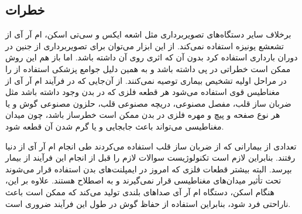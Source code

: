 \subsection{خطرات \mri}
برخلاف سایر دستگاه‌های تصویربرداری مثل اشعه ایکس و سی‌تی اسکن، ام آر آی از تشعشع یونیزه استفاده نمی‌کند. از این ابزار می‌توان برای تصویربرداری از جنین در دوران بارداری استفاده کرد بدون آن که اثری روی آن داشته باشد. اما باز هم این روش ممکن است خطراتی در پی داشته باشد و به همین دلیل جوامع پزشکی استفاده از \mri را در مراحل اولیه تشخیص بیماری توصیه نمی‌کنند. از آن‌جایی که در فرآیند ام آر آی از مغناطیس قوی استفاده می‌شود هر قطعه فلزی که در بدن وجود داشته باشد مثل ضربان ساز قلب، مفصل مصنوعی، دریچه مصنوعی قلب، حلزون مصنوعی گوش و یا هر نوع صفحه و پیچ و مهره فلزی در بدن ممکن است خطرساز باشد، چون میدان مغناطیسی می‌تواند باعث جابجایی و یا گرم شدن آن قطعه شود.

تعدادی از بیمارانی که از ضربان ساز قلب استفاده می‌کردند طی انجام ام آر آی از دنیا رفتند. بنابراین لازم است تکنولوژیست \mri سوالات لازم را قبل از انجام این فرآیند از بیمار بپرسد. البته بیشتر قطعات فلزی که امروز در ایمپلنت‌های بدن استفاده قرار می‌شوند تحت تأثیر میدان‌های مغناطیسی قرار نمی‌گیرند و به اصطلاح
 هستند. علاوه بر این، هنگام اسکن، دستگاه ام آر آی صداهای بلندی تولید می‌کند که ممکن است باعث ناراحتی فرد شود، بنابراین استفاده از حفاظ گوش در طول این فرآیند ضروری است.




